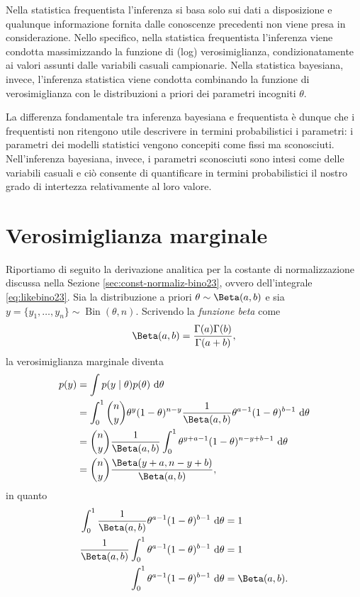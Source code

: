 \documentclass[
  10pt,
  italian,
  a4paper,
  extrafontsizes,onecolumn,openright
  ]{memoir}
\DeclareMathOperator{\Bin}{Bin} %
\theoremstyle{definition}
\theoremstyle{definition}
\theoremstyle{definition}
\theoremstyle{definition}
\theoremstyle{remark}
\begin{document}
Nella statistica frequentista l'inferenza si basa solo sui dati a disposizione e qualunque informazione fornita dalle conoscenze precedenti non viene presa in considerazione. Nello specifico, nella statistica frequentista l'inferenza viene condotta massimizzando la funzione di (log) verosimiglianza, condizionatamente ai valori assunti dalle variabili casuali campionarie. Nella statistica bayesiana, invece, l'inferenza statistica viene condotta combinando la funzione di verosimiglianza con le distribuzioni a priori dei parametri incogniti \(\theta\).

La differenza fondamentale tra inferenza bayesiana e frequentista è dunque che i frequentisti non ritengono utile descrivere in termini probabilistici i parametri: i parametri dei modelli statistici vengono concepiti come fissi ma sconosciuti. Nell'inferenza bayesiana, invece, i parametri sconosciuti sono intesi come delle variabili casuali e ciò consente di quantificare in termini probabilistici il nostro grado di intertezza relativamente al loro valore.

\hypertarget{appendix:const-norm-bino23}{%
\chapter{Verosimiglianza marginale}\label{appendix:const-norm-bino23}}

Riportiamo di seguito la derivazione analitica per la costante di normalizzazione discussa nella Sezione \ref{sec:const-normaliz-bino23}, ovvero dell'integrale \eqref{eq:likebino23}. Sia la distribuzione a priori \(\theta \sim \Beta(a, b)\) e sia \(y = \{y_1, \dots, y_n\} \sim \Bin(\theta, n)\). Scrivendo la \emph{funzione beta} come
\[
\Beta(a, b) = \frac{\Gamma(a)\Gamma(b)}{\Gamma(a+b)},
\]
\noindent
la verosimiglianza marginale diventa
\begin{align}
p(y) &= \int p(y \mid \theta) p(\theta) \,\operatorname {d}\!\theta \notag\\
&= \int_0^1 \binom{n}{y}\theta^{y} (1 - \theta)^{n- y} \frac{1}{\Beta(a,b)} \theta^{a-1} (1-\theta)^{b-1} \,\operatorname {d}\!\theta \notag\\
&= \binom{n}{y}\frac{1}{\Beta(a,b)} \int_0^1 \theta^{y + a - 1} (1-\theta)^{n- y + b-1}  \,\operatorname {d}\!\theta \notag\\
&= \binom{n}{y}\frac{\Beta(y + a, n- y + b)}{\Beta(a,b)},
\label{eq:constant-norm-beta-binom}
\end{align}
\noindent
in quanto
\begin{align}
\int_0^1 \frac{1}{\Beta(a,b)} \theta^{a-1} (1-\theta)^{b-1} \,\operatorname {d}\! \theta &= 1\notag\\
\frac{1}{\Beta(a,b)} \int_0^1  \theta^{a-1} (1-\theta)^{b-1} \,\operatorname {d}\! \theta &= 1\notag\\
\int_0^1  \theta^{a-1} (1-\theta)^{b-1} \,\operatorname {d}\!\theta &= \Beta(a,b). \notag
\end{align}
\end{document}
